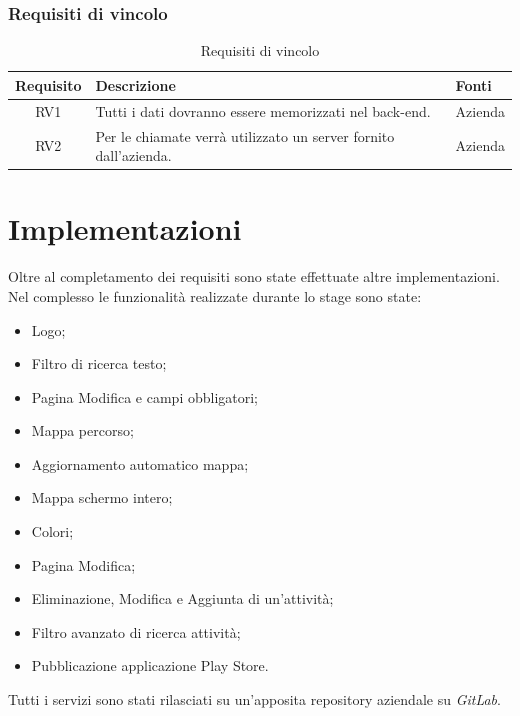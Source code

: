 \subsubsection{Requisiti di vincolo}

\begin{center}
	\begin{table}[h!]
		
		\label{tab:Requisiti di vincolo}
		\begin{tabularx}{\textwidth}{|c|p{8cm}|p{2.1cm}|}
			
			\hline
			\textbf{Requisito} & \centering\textbf{Descrizione} & \textbf{Fonti}  \\\hline
			
				RV1 & Tutti i dati dovranno essere memorizzati nel back-end.  & Azienda\\
				\hline
				RV2 & Per le chiamate verrà utilizzato un server fornito dall'azienda.  & Azienda\\
			\hline		
		\end{tabularx}
		\vspace{0.3cm}
		\caption{Requisiti di vincolo}
	\end{table}
\end{center}


\newpage

\section{Implementazioni}
Oltre al completamento dei requisiti sono state effettuate altre implementazioni.\\
Nel complesso le funzionalità realizzate durante lo stage sono state: 
\begin{itemize}
	\item Logo;
	\item Filtro di ricerca testo;
	\item Pagina Modifica e campi obbligatori;
	\item Mappa percorso;
	\item Aggiornamento automatico mappa;
	\item Mappa schermo intero;
	\item Colori;
	\item Pagina Modifica;
	\item Eliminazione, Modifica e Aggiunta di un'attività;
	\item Filtro avanzato di ricerca attività;
	\item Pubblicazione applicazione Play Store.
\end{itemize}
Tutti i servizi sono stati rilasciati su un'apposita repository aziendale su \textit{GitLab}.

